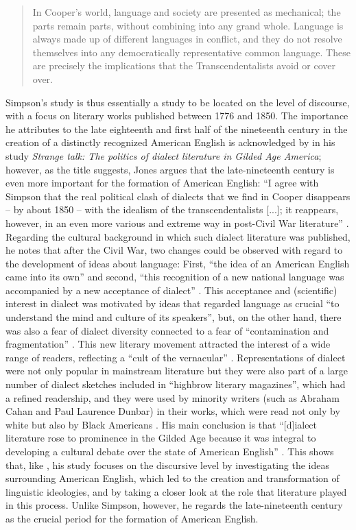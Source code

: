\begin{quote}
In Cooper’s world, language and society are presented as mechanical; the parts remain parts, without combining into any grand whole. Language is always made up of different languages in conflict, and they do not resolve themselves into any democratically representative common language. These are precisely the implications that the Transcendentalists avoid or cover over. \citep[252]{Simpson1986}
\end{quote}

Simpson’s study is thus essentially a study to be located on the level of discourse, with a focus on literary works published between 1776 and 1850. The importance he attributes to the late eighteenth and first half of the nineteenth century in the creation of a distinctly recognized American English is acknowledged by \citet{Jones1999} in his study \emph{Strange talk: The politics of dialect literature in Gilded Age America}; however, as the title suggests, Jones argues that the late-nineteenth century is even more important for the formation of American English: “I agree with Simpson that the real political clash of dialects that we find in Cooper disappears – by about 1850 – with the idealism of the transcendentalists [...]; it reappears, however, in an even more various and extreme way in post-Civil War literature” \citep[215]{Jones1999}. Regarding the cultural background in which such dialect literature was published, he notes that after the Civil War, two changes could be observed with regard to the development of ideas about language: First, “the idea of an American English came into its own” and second, “this recognition of a new national language was accompanied by a new acceptance of dialect” \citep[16--17]{Jones1999}. This acceptance and (scientific) interest in dialect was motivated by ideas that regarded language as crucial “to understand the mind and culture of its speakers”, but, on the other hand, there was also a fear of dialect diversity connected to a fear of “contamination and fragmentation” \citep[17]{Jones1999}. This new literary movement attracted the interest of a wide range of readers, reflecting a “cult of the vernacular” \citep[39]{Jones1999}. Representations of dialect were not only popular in mainstream literature but they were also part of a large number of dialect sketches included in “highbrow literary magazines”, which had a refined readership, and they were used by minority writers (such as Abraham Cahan and Paul Laurence Dunbar) in their works, which were read not only by white but also by Black Americans \citep[7]{Jones1999}. His main conclusion is that “[d]ialect literature rose to prominence in the Gilded Age because it was integral to developing a cultural debate over the state of American English” \citep[210]{Jones1999}. This shows that, like \citet{Simpson1986}, his study focuses on the discursive level by investigating the ideas surrounding American English, which led to the creation and transformation of linguistic ideologies, and by taking a closer look at the role that literature played in this process. Unlike Simpson, however, he regards the late-nineteenth century as the crucial period for the formation of American English.

